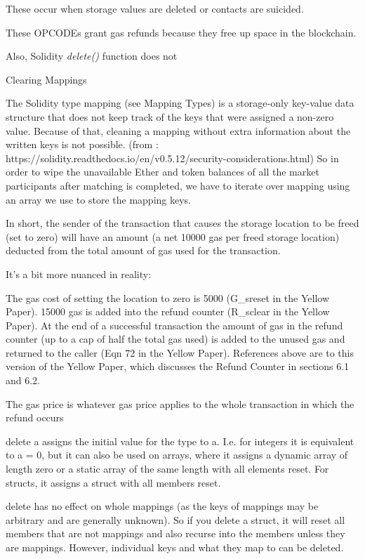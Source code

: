 These occur when storage values are deleted or contacts are suicided.

These OPCODEs grant gas refunds because they free up space in the blockchain.



Also, Solidity \textit{delete()} function does not 



Clearing Mappings

The Solidity type mapping (see Mapping Types) is a storage-only key-value data structure that does not keep track of the keys that were assigned a non-zero value. Because of that, cleaning a mapping without extra information about the written keys is not possible. (from : https://solidity.readthedocs.io/en/v0.5.12/security-considerations.html) So in order to wipe the unavailable Ether and token balances of all the market participants after matching is completed, we have to iterate over mapping using an array we use to store the mapping keys.





In short, the sender of the transaction that causes the storage location to be freed (set to zero) will have an amount (a net 10000 gas per freed storage location) deducted from the total amount of gas used for the transaction.

It's a bit more nuanced in reality:

The gas cost of setting the location to zero is 5000 (G_sreset in the Yellow Paper).
15000 gas is added into the refund counter (R_sclear in the Yellow Paper).
At the end of a successful transaction the amount of gas in the refund counter (up to a cap of half the total gas used) is added to the unused gas and returned to the caller (Eqn 72 in the Yellow Paper).
References above are to this version of the Yellow Paper, which discusses the Refund Counter in sections 6.1 and 6.2.

The gas price is whatever gas price applies to the whole transaction in which the refund occurs




delete a assigns the initial value for the type to a. I.e. for integers it is equivalent to a = 0, but it can also be used on arrays, where it assigns a dynamic array of length zero or a static array of the same length with all elements reset. For structs, it assigns a struct with all members reset.

delete has no effect on whole mappings (as the keys of mappings may be arbitrary and are generally unknown). So if you delete a struct, it will reset all members that are not mappings and also recurse into the members unless they are mappings. However, individual keys and what they map to can be deleted.











